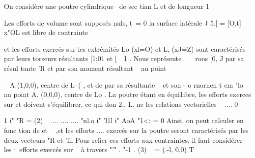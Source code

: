 On considère une poutre cylindrique 
\ 
de sec tian L et de longueur 1 


Les efforts de volume sont supposés nuls, t~= 0 la surface latérale
J 
5.[ = [O,t] x"OL est libre de contrainte 

et les efforts exercés sur les extrémités Lo (xl=O) et L, (xJ=Z) sont caractérisés par leurs torseurs résultants [1;01 et [~~1 . Nous représente­
~ 
~ 
rons [0, J par sa résul tante 'R et par son moment résultant ~ au point 

~ 
A (1,0,0), centre de L--( , et de 
par sa résultante ~ et son 
-
o 
rnornen t cm
"lo au point A. (0,0,0), centre de Lo . La poutre étant en équi­1ibre, les efforts exerces sur et doivent s'équilibrer, ce qui don­
2.. L. 
ne les relations vectorielles 
~
.... 
0
{ 
1\0 i" "R = 
(2) 
~
.... .... .... 
"nl.o i" 'l1l i" AoA "1<: = 0 Ainsi, on peut calculer en fonc tion de et ~ ,et les efforts 
.... 
exercés sur la poutre seront 
caractérisés par les deux vecteurs "R et 'fil­
Pour relier ces efforts aux contraintes, il faut considérer les· 
efforts exercés sur ~ à travers "'" .
"-1 . 
(3) ~ = (.-l, 0,0) T 

}
